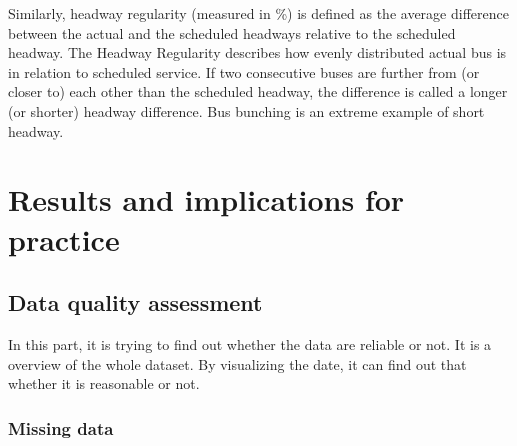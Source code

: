\documentclass[12pt]{report}
\begin{document}
Similarly, headway regularity (measured in \%) is defined as the average difference between the actual and the scheduled headways relative to the scheduled headway. The Headway Regularity describes how evenly distributed actual bus is in relation to scheduled service. If two consecutive buses are further from (or closer to) each other than the scheduled headway, the difference is called a longer (or shorter) headway difference. Bus bunching is an extreme example of short headway.

\newpage

\section{Results and implications for practice}


\vspace{0.5cm}









 

\subsection{Data quality assessment}


 In this part, it is trying to find out whether the data are reliable or not. It is a overview of the whole dataset. By visualizing the date, it can find out that whether it is reasonable or not.
 
 \subsubsection*{Missing data}
 
\end{document}
